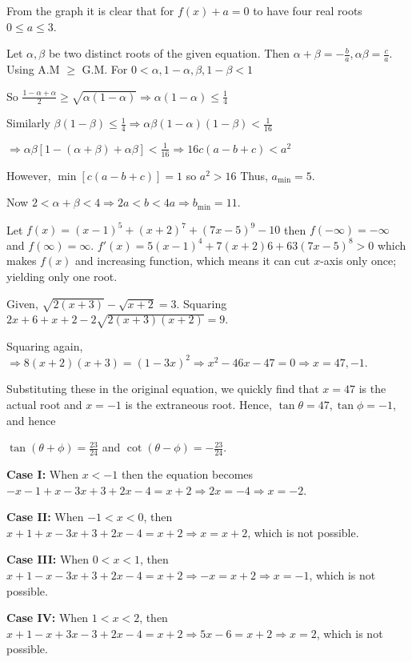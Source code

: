   From the graph it is clear that for $f(x) + a = 0$ to have four real roots $0\leq a\leq 3$.
\item Let $\alpha, \beta$ be two distinct roots of the given equation. Then $\alpha + \beta = -\frac{b}{a},
  \alpha\beta = \frac{c}{a}$. Using A.M $\geq$ G.M. For $0 < \alpha, 1 - \alpha, \beta, 1 - \beta < 1$

  So $\frac{1 - \alpha + \alpha}{2}\geq\sqrt{\alpha(1 - \alpha)} \Rightarrow \alpha(1 - \alpha)\leq
  \frac{1}{4}$

  Similarly $\beta(1 - \beta)\leq \frac{1}{4}\Rightarrow \alpha\beta(1 - \alpha)(1 - \beta)< \frac{1}{16}$

  $\Rightarrow \alpha\beta[1 - (\alpha + \beta) + \alpha\beta] < \frac{1}{16}\Rightarrow 16c(a - b + c) <
  a^2$

  However, $\min[c(a - b + c)] = 1$ so $a^2 > 16$ Thus, $a_{\min} = 5$.

  Now $2 < \alpha + \beta < 4 \Rightarrow 2a < b < 4a \Rightarrow b_{\min} = 11$.
\item Let $f(x) = (x - 1)^5 + (x + 2)^7 + (7x - 5)^9 - 10$ then $f(-\infty) = -\infty$ and $f(\infty) =
  \infty$. $f'(x) = 5(x - 1)^4 + 7(x + 2)6 + 63(7x - 5)^8 > 0$ which makes $f(x)$ and increasing function,
  which means it can cut $x$-axis only once; yielding only one root.
\item Given, $\sqrt{2(x + 3)} - \sqrt{x + 2} = 3$. Squaring $2x + 6 + x + 2 - 2\sqrt{2(x + 3)(x + 2)} = 9$.

  Squaring again, $\Rightarrow 8(x + 2)(x + 3) = (1 - 3x)^2 \Rightarrow x^2 - 46x - 47 = 0 \Rightarrow x =
  47, -1$.

  Substituting these in the original equation, we quickly find that $x = 47$ is the actual root and $x = -1$
  is the extraneous root. Hence, $\tan\theta = 47, \tan\phi = -1$, and hence

  $\tan(\theta + \phi) = \frac{23}{24}$ and $\cot(\theta - \phi) = -\frac{23}{24}$.
\item {\bf Case I:} When $x < -1$ then the equation becomes $-x - 1 + x - 3x + 3 + 2x - 4 = x + 2 \Rightarrow
  2x = -4\Rightarrow x = -2$.

  {\bf Case II:} When $-1 < x < 0$, then $x + 1 + x - 3x + 3 + 2x - 4 = x + 2\Rightarrow x = x + 2$,
  which is not possible.

  {\bf Case III:} When $0 < x < 1$, then $x + 1 - x - 3x + 3 + 2x - 4 = x + 2 \Rightarrow -x = x + 2
  \Rightarrow x = -1$, which is not possible.

  {\bf Case IV:} When $1 < x < 2$, then $x + 1 - x + 3x - 3 + 2x - 4 = x + 2 \Rightarrow 5x - 6 = x +
  2\Rightarrow x = 2$, which is not possible.

